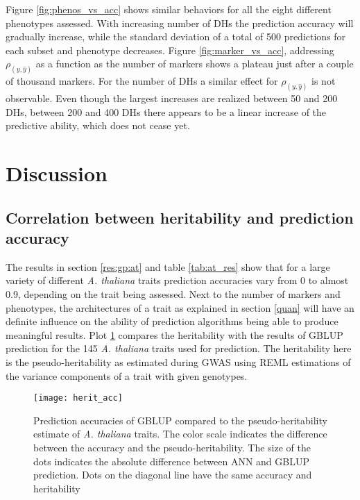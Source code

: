 Figure \ref{fig:phenos_vs_acc} shows similar behaviors for all the eight different
phenotypes assessed. With increasing number of DHs the prediction accuracy will gradually
increase, while the standard deviation of a total of 500 predictions for each subset and
phenotype decreases. Figure \ref{fig:marker_vs_acc}, addressing $\rho_{(y,\hat{y})}$ as a
function as the number of markers shows a plateau just after a couple of thousand
markers. For the number of DHs a similar effect for $\rho_{(y,\hat{y})}$ is not
observable. Even though the largest increases are realized between 50 and 200 DHs, between
200 and 400 DHs there appears to be a linear increase of the predictive ability, which
does not cease yet. 

\section{Discussion}\label{gpdis}
\subsection{Correlation between heritability and prediction accuracy}

The results in section \ref{res:gp:at} and table \ref{tab:at_res} show that for a large
variety of different \textit{A. thaliana} traits prediction accuracies vary from 0 to
almost 0.9, depending on the trait being assessed. Next to the number of markers and
phenotypes, the architectures of a trait as explained in section \ref{quan} will have an
definite influence on the ability of prediction algorithms being able to produce
meaningful results. Plot \ref{fig:herit_gp} compares the heritability with the results of
GBLUP prediction for the 145 \textit{A. thaliana} traits used for prediction. The
heritability here is the pseudo-heritability as estimated during GWAS using REML
estimations of the variance components of a trait with given genotypes. 

\begin{figure}[H]
 \centering \texttt{[image: herit\_acc]}
 \decoRule
 \caption[Prediction accuracies of GBLUP compared to the heritability of
 \textit{A. thaliana} traits]{Prediction accuracies of GBLUP compared to the
   pseudo-heritability estimate of \textit{A. thaliana} traits. The color scale indicates the
   difference between the accuracy and the pseudo-heritability. The size of the dots
   indicates the absolute difference between ANN and GBLUP prediction. Dots on the
   diagonal line have the same accuracy and heritability}
\label{fig:herit_gp}
\end{figure}


